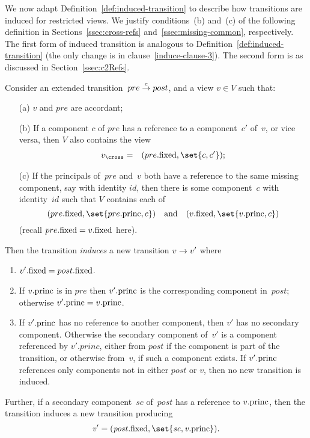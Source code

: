 We now adapt Definition~\ref{def:induced-transition} to describe how
transitions are induced for restricted views.  We justify conditions~(b)
and~(c) of the following definition in Sections~\ref{ssec:cross-refs}
and~\ref{ssec:missing-common}, respectively.  The first form of induced
transition is analogous to Definition~\ref{def:induced-transition} (the only
change is in clause~\ref{induce-clause-3}).  The second form is as discussed
in Section~\ref{ssec:c2Refs}.
%
\begin{definition}
\label{def:induced-transition-singleRef}
Consider an extended transition~$pre \stackrel{e}\rightarrow post$, and a view $v \in V$
such that:
%
\begin{enumerate}
\item[(a)] $v$ and $pre$ are accordant;

\item[(b)] If a component $c$ of $pre$ has a reference
  to a component~$c'$ of~$v$, or vice versa, then $V$ also contains the view
\begin{eqnarray*}
v_\cross & = & (pre.\fixed, \set{c, c'});
\end{eqnarray*}

\item[(c)] If the principals of~$pre$ and~$v$ both have a reference to the
  same missing component, say with identity $id$, then there is some
  component~$c$ with identity~$id$ such that $V$ contains each of
\[
(pre.\fixed, \set{pre.\princ, c}) \quad\mbox{and}\quad 
(v.\fixed, \set{v.\princ, c})
\]
(recall $pre.\mathrm{fixed} = v.\mathrm{fixed}$ here).
\end{enumerate}
%
Then the transition \emph{induces} a new
transition $v \stackrel{}\rightarrow v'$ where
\begin{enumerate}
\item $v'.\mathrm{fixed} = post.\mathrm{fixed}$.

\item If $v.\mathrm{princ}$ is in $pre$ then $v'.\mathrm{princ}$ is the corresponding
  component in~$post$; otherwise $v'.\mathrm{princ} = v.\mathrm{princ}$.

\item\label{induce-clause-3} If $v'.\mathrm{princ}$ has no reference to another
  component, then $v'$ has no secondary component.  Otherwise the secondary
  component of~$v'$ is a component referenced by $v'.princ$, either from
  $post$ if the component is part of the transition, or otherwise from~$v$, if
  such a component exists.  If $v'.\mathrm{princ}$ references only components not in
  either $post$ or $v$, then no new transition is induced.
\end{enumerate}
%
Further, if a secondary component~$sc$ of~$post$ has a reference to $v.\mathrm{princ}$,
then the transition induces a new transition producing
\[\mit
v' = (post.\fixed, \set{sc, v.\princ}).
\]
\end{definition}

